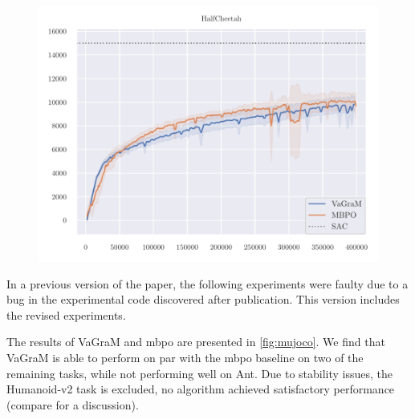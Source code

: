 \begin{figure}[t]
\begin{center}
\begin{minipage}{.49\textwidth}
    \centering
    \includegraphics[width=\textwidth]{figures/vagram/cheetah_nonorm.pdf}
\end{minipage}
\end{center}
    \caption{}
    \label{fig:mujoco}
\end{figure}


In a previous version of the paper, the following experiments were faulty due to a bug in the experimental code discovered after publication.
This version includes the revised experiments.

The results of VaGraM and \ac{mbpo} are presented in \autoref{fig:mujoco}. We find that VaGraM is able to perform on par with the \ac{mbpo} baseline on two of the remaining tasks, while not performing well on Ant. Due to stability issues, the Humanoid-v2 task is excluded, no algorithm achieved satisfactory performance (compare \textcite{pineda2021mbrl} for a discussion). 

